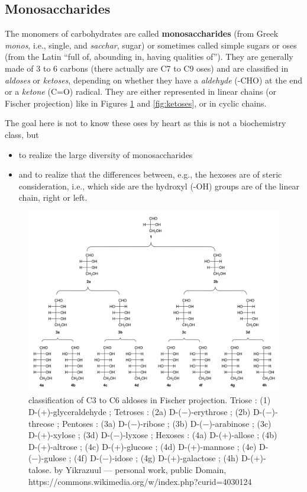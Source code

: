 \documentclass[]{book}
\providecommand{\tightlist}{%
  \setlength{\itemsep}{0pt}\setlength{\parskip}{0pt}}
\theoremstyle{definition}
\theoremstyle{definition}
\theoremstyle{definition}
\theoremstyle{remark}
\begin{document}
\subsection{Monosaccharides}\label{monosaccharides}

The monomers of carbohydrates are called \textbf{monosaccharides} (from
Greek \emph{monos}, i.e., single, and \emph{sacchar}, sugar) or
sometimes called simple sugars or oses (from the Latin ``full of,
abounding in, having qualities of''). They are generally made of 3 to 6
carbons (there actually are C7 to C9 oses) and are classified in
\emph{aldoses} or \emph{ketoses}, depending on whether they have a
\emph{aldehyde} (-CHO) at the end or a \emph{ketone} (C=O) radical. They
are either represented in linear chains (or Fischer projection) like in
Figures \ref{fig:aldoses} and \ref{fig:ketoses}, or in cyclic chains.

The goal here is not to know these oses by heart as this is not a
biochemistry class, but

\begin{itemize}
\tightlist
\item
  to realize the large diversity of monosaccharides
\item
  and to realize that the differences between, e.g., the hexoses are of
  steric consideration, i.e., which side are the hydroxyl (-OH) groups
  are of the linear chain, right or left.
\end{itemize}

\begin{figure}

{\centering \includegraphics[width=1\linewidth]{pictures/aldoses} 

}

\caption{classification of C3 to C6 aldoses in Fischer projection. Triose : (1) D-(+)-glyceraldehyde ; Tetroses : (2a) D-(−)-erythrose ; (2b) D-(−)-threose ; Pentoses : (3a) D-(−)-ribose ; (3b) D-(−)-arabinose ; (3c) D-(+)-xylose ; (3d) D-(−)-lyxose ; Hexoses : (4a) D-(+)-allose ; (4b) D-(+)-altrose ; (4c) D-(+)-glucose ; (4d) D-(+)-mannose ; (4e) D-(−)-gulose ; (4f) D-(−)-idose ; (4g) D-(+)-galactose ; (4h) D-(+)-talose. by Yikrazuul — personal work, public Domain, https://commons.wikimedia.org/w/index.php?curid=4030124  }\label{fig:aldoses}
\end{figure}
\end{document}
